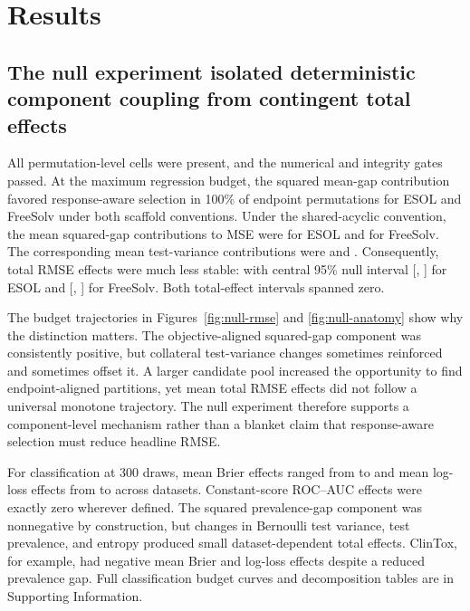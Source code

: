 \section{Results}

\subsection{The null experiment isolated deterministic component coupling from contingent total effects}

All \PermutationRows{} permutation-level cells were present, and the numerical and integrity gates passed. At the maximum regression budget, the squared mean-gap contribution favored response-aware selection in 100\% of endpoint permutations for ESOL and FreeSolv under both scaffold conventions. Under the shared-acyclic convention, the mean squared-gap contributions to MSE were \ESGapSqMean{} for ESOL and \FSGapSqMean{} for FreeSolv. The corresponding mean test-variance contributions were \ESVarianceMean{} and \FSVarianceMean{}. Consequently, total RMSE effects were much less stable: \ESNullRMSEMean{} with central 95\% null interval [\ESNullRMSELow{}, \ESNullRMSEHigh{}] for ESOL and \FSNullRMSEMean{} [\FSNullRMSELow{}, \FSNullRMSEHigh{}] for FreeSolv. Both total-effect intervals spanned zero.

The budget trajectories in Figures~\ref{fig:null-rmse} and \ref{fig:null-anatomy} show why the distinction matters. The objective-aligned squared-gap component was consistently positive, but collateral test-variance changes sometimes reinforced and sometimes offset it. A larger candidate pool increased the opportunity to find endpoint-aligned partitions, yet mean total RMSE effects did not follow a universal monotone trajectory. The null experiment therefore supports a component-level mechanism rather than a blanket claim that response-aware selection must reduce headline RMSE.

For classification at 300 draws, mean Brier effects ranged from \ClassBrierMin{} to \ClassBrierMax{} and mean log-loss effects from \ClassLogLossMin{} to \ClassLogLossMax{} across datasets. Constant-score ROC--AUC effects were exactly zero wherever defined. The squared prevalence-gap component was nonnegative by construction, but changes in Bernoulli test variance, test prevalence, and entropy produced small dataset-dependent total effects. ClinTox, for example, had negative mean Brier and log-loss effects despite a reduced prevalence gap. Full classification budget curves and decomposition tables are in Supporting Information.

